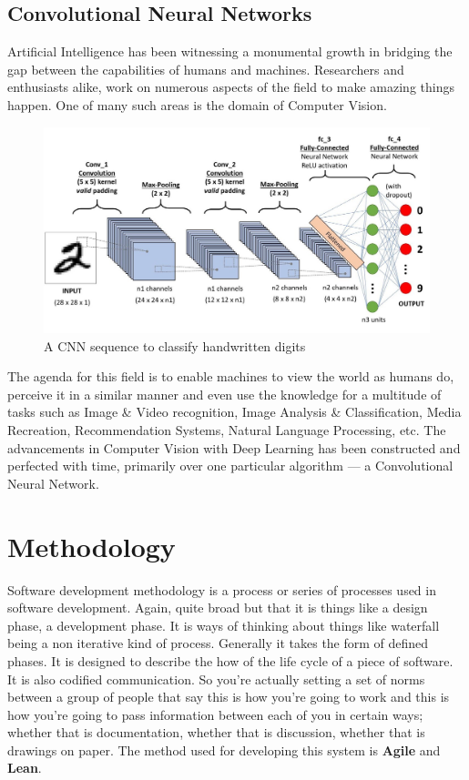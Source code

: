 \documentclass[11pt]{article}
\begin{document}
\subsection{Convolutional Neural Networks}
\label{sec:orgf01cacd}
Artificial Intelligence has been witnessing a monumental growth in bridging the gap between the capabilities
of humans and machines. Researchers and enthusiasts alike, work on numerous aspects of the field to make amazing
things happen. One of many such areas is the domain of Computer Vision.
\begin{figure}[htbp]
\centering
\includegraphics[width=.9\linewidth]{./img/cnn.jpg}
\caption{\label{fig:org4ccaa3d}A CNN sequence to classify handwritten digits}
\end{figure}
The agenda for this field is to enable machines to view the world as humans do, perceive it in a similar manner
and even use the knowledge for a multitude of tasks such as Image \& Video recognition, Image Analysis \&
Classification, Media Recreation, Recommendation Systems, Natural Language Processing, etc. The advancements in
Computer Vision with Deep Learning has been constructed and perfected with time, primarily over one particular
algorithm — a Convolutional Neural Network.
\clearpage

\section{Methodology}
\label{sec:org5279fea}
Software development methodology is a process or series of processes used in software development.
Again, quite broad but that it is things like a design phase, a development phase. It is ways of
thinking about things like waterfall being a non iterative kind of process. Generally it takes the
form of defined phases. It is designed to describe the how of the life cycle of a piece of software.
It is also codified communication. So you’re actually setting a set of norms between a group of people
that say this is how you’re going to work and this is how you’re going to pass information between
each of you in certain ways; whether that is documentation, whether that is discussion, whether that
is drawings on paper.
The method used for developing this system is \textbf{Agile} and \textbf{Lean}.
\end{document}
